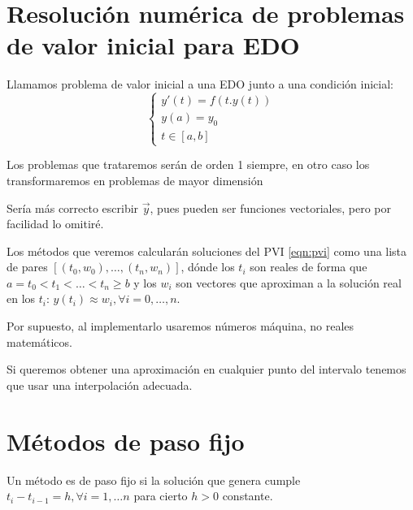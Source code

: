 
\section{Resolución numérica de problemas de valor inicial para EDO}

\begin{definition}
    Llamamos problema de valor inicial a una EDO junto a una condición inicial:
\begin{equation} \label{eqn:pvi}
\begin{cases}
    y'(t)=f(t.y(t)) \\
    y(a) = y_0 \\
    t\in[a,b]
\end{cases}
\end{equation}
\end{definition}

\begin{remark}Los problemas que trataremos serán de orden 1 siempre, en otro caso los transformaremos en problemas de mayor dimensión \end{remark}
\begin{remark}Sería más correcto escribir $\vec y$, pues pueden ser funciones vectoriales, pero por facilidad lo omitiré. \end{remark}

    Los métodos que veremos calcularán soluciones del PVI \ref{eqn:pvi} como una lista de pares $[(t_0,w_0), \dots, (t_n,w_n)]$, dónde los $t_i$ son reales de forma que $a=t_0<t_1<\dots < t_n\geq b$ y los $w_i$ son vectores que aproximan a la solución real en los $t_i$: $y(t_i)\approx w_i,\forall i=0,\dots, n$.

\begin{remark} Por supuesto, al implementarlo usaremos números máquina, no reales matemáticos.  \end{remark}
\begin{remark} Si queremos obtener una aproximación en cualquier punto del intervalo tenemos que usar una interpolación adecuada. \end{remark}

\section{Métodos de paso fijo}

\begin{definition}  Un método es de paso fijo si la solución que genera cumple $t_i-t_{i-1}=h,\forall i=1,\dots n$ para cierto $h>0$ constante. \end{definition}

